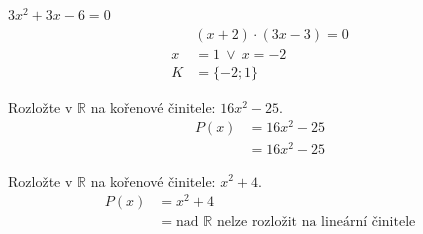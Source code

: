 \documentclass[11pt,a4paper]{article}
\begin{document}
\begin{zadaniReseniBox}[title={Samostatná práce 2}]
$3x^{2} + 3x - 6=0$
\tcblower
\[
\begin{aligned}
&\left(x + 2\right) \cdot \left(3x - 3\right)=0\\[2pt]
x&=1\ \vee\ x=-2\\[2pt]
K&=\{-2;1\}
\end{aligned}
\]
\end{zadaniReseniBox}

\begin{zadaniReseniBox}[title={Rozšíření 1}]
Rozložte v $\mathbb R$ na kořenové činitele: $16x^{2} - 25$.
\tcblower
\[
\begin{aligned}P(x)&=16x^{2} - 25\\ &= 16x^{2} - 25\end{aligned}
\]
\end{zadaniReseniBox}

\begin{zadaniReseniBox}[title={Rozšíření 2}]
Rozložte v $\mathbb R$ na kořenové činitele: $x^{2} + 4$.
\tcblower
\[
\begin{aligned}P(x)&=x^{2} + 4\\ &= \text{nad }\mathbb R\text{ nelze rozložit na lineární činitele}\end{aligned}
\]
\end{zadaniReseniBox}
\end{document}
